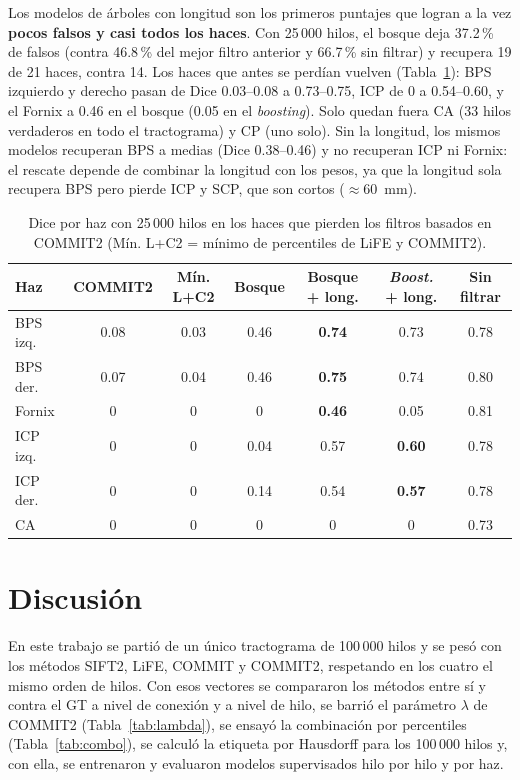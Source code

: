 \documentclass[11pt,a4paper]{article}
\begin{document}
Los modelos de \'arboles con longitud son los primeros puntajes que logran a la vez
\textbf{pocos falsos y casi todos los haces}. Con 25\,000 hilos, el bosque deja 37.2\,\% de
falsos (contra 46.8\,\% del mejor filtro anterior y 66.7\,\% sin filtrar) y recupera 19 de
21 haces, contra 14. Los haces que antes se perd\'ian vuelven (Tabla~\ref{tab:haces-perdidos}):
BPS izquierdo y derecho pasan de Dice 0.03--0.08 a 0.73--0.75, ICP de 0 a 0.54--0.60, y el
Fornix a 0.46 en el bosque (0.05 en el \textit{boosting}). Solo quedan fuera CA (33 hilos
verdaderos en todo el tractograma) y CP (uno solo). Sin la longitud, los mismos modelos
recuperan BPS a medias (Dice 0.38--0.46) y no recuperan ICP ni Fornix: el rescate depende de
combinar la longitud con los pesos, ya que la longitud sola recupera BPS pero pierde ICP y
SCP, que son cortos ($\approx$60~mm).

\begin{table}[H]
\centering
\small
\begin{tabular}{@{}lcccccc@{}}
\toprule
\textbf{Haz} & \textbf{COMMIT2} & \textbf{M\'in. L+C2} & \textbf{Bosque} & \textbf{Bosque + long.} & \textbf{\textit{Boost.} + long.} & \textbf{Sin filtrar}\\
\midrule
BPS izq.  & 0.08 & 0.03 & 0.46 & \textbf{0.74} & 0.73 & 0.78\\
BPS der.  & 0.07 & 0.04 & 0.46 & \textbf{0.75} & 0.74 & 0.80\\
Fornix    & 0    & 0    & 0    & \textbf{0.46} & 0.05 & 0.81\\
ICP izq.  & 0    & 0    & 0.04 & 0.57 & \textbf{0.60} & 0.78\\
ICP der.  & 0    & 0    & 0.14 & 0.54 & \textbf{0.57} & 0.78\\
CA        & 0    & 0    & 0    & 0    & 0    & 0.73\\
\bottomrule
\end{tabular}
\caption{Dice por haz con 25\,000 hilos en los haces que pierden los filtros basados en
COMMIT2 (M\'in. L+C2 = m\'inimo de percentiles de LiFE y COMMIT2).}
\label{tab:haces-perdidos}
\end{table}

\section{Discusión}

En este trabajo se parti\'o de un \'unico tractograma de 100\,000 hilos y se pes\'o con los m\'etodos SIFT2, LiFE, COMMIT y COMMIT2, respetando en los cuatro el mismo orden de hilos. Con esos vectores se compararon los m\'etodos entre s\'i y contra el GT a nivel de conexi\'on y a nivel de hilo, se barri\'o el par\'ametro $\lambda$ de COMMIT2 (Tabla~\ref{tab:lambda}), se ensay\'o la combinaci\'on por percentiles (Tabla~\ref{tab:combo}), se calcul\'o la etiqueta por Hausdorff para los 100\,000 hilos y, con ella, se entrenaron y evaluaron modelos supervisados hilo por hilo y por haz.
\end{document}
